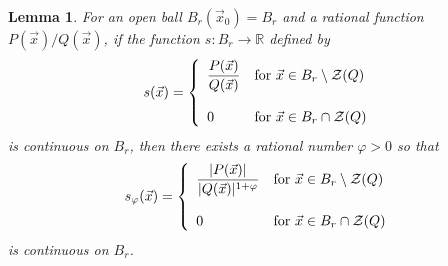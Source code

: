 \documentclass[12pt]{amsart}
\newtheorem{lem}[thm]{Lemma}
\theoremstyle{definition}
\theoremstyle{remark}
\numberwithin{equation}{section}
\newcommand{\re}{\mathbb{R}}
\newcommand{\vv}{\mathcal{Z}}
\begin{document}

\begin{lem}\label{lem3.3}
  For an open ball $B_r(\vec x_0)=B_r$ and a rational function $P(\vec x)/Q(\vec x)$, if the function $s:B_r\to\re$ defined by
  $$s(\vec x)=\left\{\begin{array}{ll}{\displaystyle{\frac{P(\vec x)}{Q(\vec x)}}} & \mbox{\rm{for} $\vec x\in B_r\setminus\vv(Q)$}\\ & \\0& \mbox{\rm{for} $\vec x\in B_r\cap\vv(Q)$} \end{array}\right.$$ is continuous on $B_r$,
%  
  then there exists a rational number $\varphi>0$ so that
    $$s_\varphi(\vec x)=\left\{\begin{array}{ll}{\displaystyle{\frac{|P(\vec x)|}{|Q(\vec x)|^{1+\varphi}}}} & \mbox{\rm{for} $\vec x\in B_r\setminus\vv(Q)$}\\ & \\0& \mbox{\rm{for} $\vec x\in B_r\cap\vv(Q)$} \end{array}\right.$$ is continuous on $B_r$.
%
\end{lem}
\end{document}
